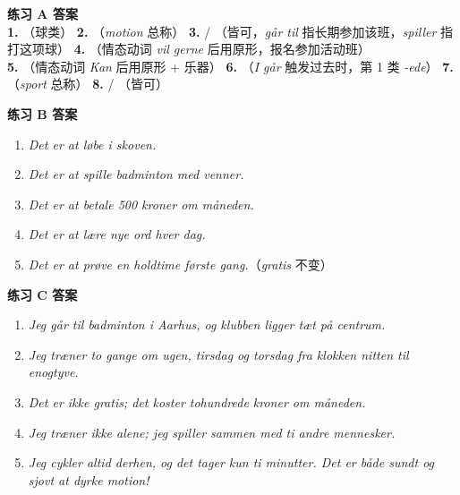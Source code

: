 \begin{answerbox}
\textbf{练习 A 答案}\\
\textbf{1.} （球类） \quad \textbf{2.} （\textit{motion} 总称） \quad \textbf{3.}  / （皆可，\textit{går til} 指长期参加该班，\textit{spiller} 指打这项球） \quad \textbf{4.} （情态动词 \textit{vil gerne} 后用原形，报名参加活动班）\\
\textbf{5.} （情态动词 \textit{Kan} 后用原形 + 乐器） \quad \textbf{6.} （\textit{I går} 触发过去时，第 1 类 \textit{-ede}） \quad \textbf{7.} （\textit{sport} 总称） \quad \textbf{8.}  / （皆可）

\textbf{练习 B 答案}
\begin{enumerate}
  \item \textit{Det er  at løbe i skoven.}
  \item \textit{Det er  at spille badminton med venner.}
  \item \textit{Det er  at betale 500 kroner om måneden.}
  \item \textit{Det er  at lære nye ord hver dag.}
  \item \textit{Det er  at prøve en holdtime første gang.}（\textit{gratis} 不变）
\end{enumerate}

\textbf{练习 C 答案}
\begin{enumerate}
  \item \textit{Jeg går til badminton i Aarhus, og klubben ligger tæt på centrum.}
  \item \textit{Jeg træner to gange om ugen, tirsdag og torsdag fra klokken nitten til enogtyve.}
  \item \textit{Det er ikke gratis; det koster tohundrede kroner om måneden.}
  \item \textit{Jeg træner ikke alene; jeg spiller sammen med ti andre mennesker.}
  \item \textit{Jeg cykler altid derhen, og det tager kun ti minutter. Det er både sundt og sjovt at dyrke motion!}
\end{enumerate}


\end{answerbox}
